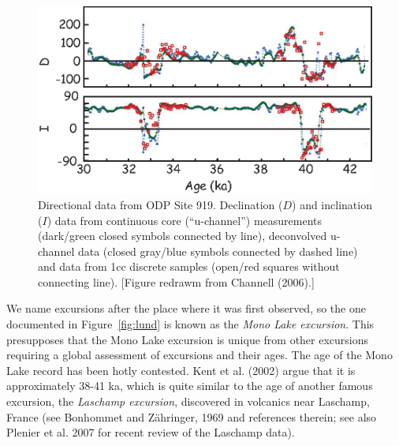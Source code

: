 \begin{figure}[htb]
\centering  \includegraphics[width=10 cm]{EPSfiles/919.eps}
\caption{Directional data from ODP Site 919.  Declination ($D$) and inclination ($I$) data from continuous core (``u-channel'') measurements  (dark/green closed symbols connected by line), deconvolved u-channel data (closed gray/blue symbols connected by dashed line) and data from 1cc
 discrete samples (open/red squares without connecting line). [Figure redrawm from Channell (2006).] } 
\label{fig:919}
\end{figure}



We name excursions after the place where it was first observed, so the one documented in Figure~\ref{fig:lund} is  known as   the
{\it Mono Lake excursion}.       This presupposes that the Mono Lake excursion is unique from other excursions requiring a global assessment of excursions and  their ages.    The age of the Mono Lake record has been hotly contested. 
 Kent et al. (2002) \nocite{kent02}  argue that it is approximately 38-41 ka, which is quite similar to the age of another famous  excursion, the 
{\it Laschamp excursion}, discovered in volcanics near Laschamp, France (see 
 Bonhommet and
  Z\"ahringer, 1969 and references therein; see also 
  Plenier et al. 2007 for recent review of the Laschamp data). \nocite{bonhommet69}    \nocite{plenier07}   

